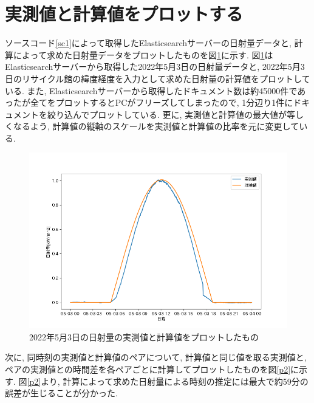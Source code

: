 \documentclass[a4j,12pt,]{jarticle}
\begin{document}
\section{実測値と計算値をプロットする}
ソースコード\ref{sc1}によって取得したElasticsearchサーバーの日射量データと, 計算によって求めた日射量データをプロットしたものを図\ref{p1}に示す.
図\ref{p1}はElasticsearchサーバーから取得した2022年5月3日の日射量データと, 2022年5月3日のリサイクル館の緯度経度を入力として求めた日射量の計算値をプロットしている.
また, Elasticsearchサーバーから取得したドキュメント数は約45000件であったが全てをプロットするとPCがフリーズしてしまったので, 1分辺り1件にドキュメントを絞り込んでプロットしている.
更に, 実測値と計算値の最大値が等しくなるよう, 計算値の縦軸のスケールを実測値と計算値の比率を元に変更している.

\begin{figure}[H]
  \begin{center}
    \includegraphics[width=160mm]{compare.png}
    \caption{2022年5月3日の日射量の実測値と計算値をプロットしたもの}
    \label{p1}
  \end{center}
\end{figure}

次に, 同時刻の実測値と計算値のペアについて, 計算値と同じ値を取る実測値と, ペアの実測値との時間差を各ペアごとに計算してプロットしたものを図\ref{p2}に示す.
図\ref{p2}より, 計算によって求めた日射量による時刻の推定には最大で約59分の誤差が生じることが分かった.
\end{document}
